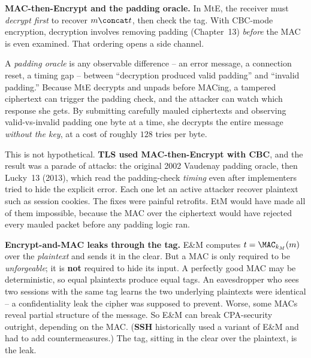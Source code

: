 \begin{attackbox}
\textbf{MAC-then-Encrypt and the padding oracle.} In MtE, the receiver must \emph{decrypt first} to recover $m\concat t$, then check the tag. With CBC-mode encryption, decryption involves removing padding (Chapter~13) \emph{before} the MAC is even examined. That ordering opens a side channel.

A \emph{padding oracle} is any observable difference -- an error message, a connection reset, a timing gap -- between ``decryption produced valid padding'' and ``invalid padding.'' Because MtE decrypts and unpads before MACing, a tampered ciphertext can trigger the padding check, and the attacker can watch which response she gets. By submitting carefully mauled ciphertexts and observing valid-vs-invalid padding one byte at a time, she decrypts the entire message \emph{without the key}, at a cost of roughly $128$ tries per byte.

This is not hypothetical. \textbf{TLS used MAC-then-Encrypt with CBC}, and the result was a parade of attacks: the original 2002 Vaudenay padding oracle, then Lucky~13 (2013), which read the padding-check \emph{timing} even after implementers tried to hide the explicit error. Each one let an active attacker recover plaintext such as session cookies. The fixes were painful retrofits. EtM would have made all of them impossible, because the MAC over the ciphertext would have rejected every mauled packet before any padding logic ran.
\end{attackbox}

\begin{attackbox}
\textbf{Encrypt-and-MAC leaks through the tag.} E\&M computes $t=\MAC_{k_M}(m)$ over the \emph{plaintext} and sends it in the clear. But a MAC is only required to be \emph{unforgeable}; it is \textbf{not} required to hide its input. A perfectly good MAC may be deterministic, so equal plaintexts produce equal tags. An eavesdropper who sees two sessions with the same tag learns the two underlying plaintexts were identical -- a confidentiality leak the cipher was supposed to prevent. Worse, some MACs reveal partial structure of the message. So E\&M can break CPA-security outright, depending on the MAC. (\textbf{SSH} historically used a variant of E\&M and had to add countermeasures.) The tag, sitting in the clear over the plaintext, is the leak.
\end{attackbox}

